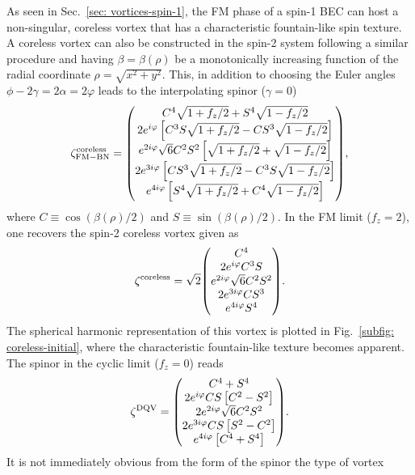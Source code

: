 As seen in Sec.~\ref{sec: vortices-spin-1}, the FM phase of a spin-1 BEC can
host a non-singular, coreless vortex that has a characteristic fountain-like
spin texture.
A coreless vortex can also be constructed in the spin-2 system following a
similar procedure and having \(\beta=\beta(\rho)\) be a monotonically increasing
function of the radial coordinate \(\rho = \sqrt{x^2 + y^2}\).
This, in addition to choosing the Euler angles
\(\phi - 2\gamma = 2\alpha = 2\varphi \) leads to the interpolating spinor
(\(\gamma=0\))
\begin{equation}\label{eq: FM-BN-coreless-DQV}
    \zeta_\mathrm{FM-BN}^\mathrm{coreless} = \mqty(
    C^4\sqrt{1+f_z/2} + S^4\sqrt{1-f_z/2} \\
    2e^{i\varphi}\left[C^3S\sqrt{1+f_z/2}
        - CS^3\sqrt{1-f_z/2}\right] \\
    e^{2i\varphi}\sqrt{6}C^2S^2\left[\sqrt{1+f_z/2}
        + \sqrt{1-f_z/2} \right] \\
    2e^{3i\varphi}\left[CS^3\sqrt{1+f_z/2}
        - C^3S\sqrt{1-f_z/2}\right] \\
    e^{4i\varphi}\left[S^4\sqrt{1+f_z/2} + C^4\sqrt{1-f_z/2} \right]
    ),
\end{equation}
where \(C \equiv \cos(\beta(\rho)/2)\) and \(S \equiv \sin(\beta(\rho)/2)\).
In the FM limit (\(f_z=2\)), one recovers the spin-2 coreless vortex given as
\begin{equation}\label{eq: FM-BN-coreless}
    \zeta^\mathrm{coreless} = \sqrt{2}\mqty(C^4 \\ 2e^{i\varphi}C^3S \\
    e^{2i\varphi}\sqrt{6}C^2S^2 \\ 2e^{3i\varphi}CS^3 \\ e^{4i\varphi}S^4
    ).
\end{equation}
The spherical harmonic representation of this vortex is plotted in
Fig.~\ref{subfig: coreless-initial}, where the characteristic fountain-like
texture becomes apparent.
The spinor in the cyclic limit (\(f_z=0\)) reads
\begin{equation}\label{eq: FM-BN-DQV}
    \zeta^\mathrm{DQV} = \mqty(
    C^4 + S^4 \\
    2e^{i\varphi}CS\left[C^2-S^2\right] \\
    2e^{2i\varphi}\sqrt{6}C^2S^2 \\
    2e^{3i\varphi}CS\left[S^2 - C^2\right] \\
    e^{4i\varphi}\left[C^4 + S^4\right]).
\end{equation}
It is not immediately obvious from the form of the spinor the type of vortex
